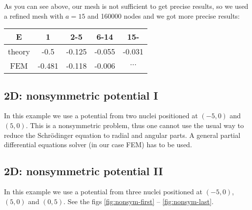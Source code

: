 As you can see above, our mesh is not sufficient to get precise results, so we
used a refined mesh with $a=15$ and 160000 nodes and we got more precise
results:

\begin{tabular}{ c | c c c c }
E      & 1 & 2-5 & 6-14 & 15- \\
\hline
theory & -0.5 & -0.125 & -0.055 & -0.031 \\
FEM    & -0.481 & -0.118 & -0.006 & $\cdots$ \\
\end{tabular}

\subsection{2D: nonsymmetric potential I}

In this example we use a potential from two nuclei positioned at $(-5, 0)$ and
$(5, 0)$. This is a nonsymmetric problem, thus one cannot use the usual
way to reduce the Schr\"odinger equation to radial and angular
parts. A general partial differential equations solver (in our case FEM) has to
be used.

\subsection{2D: nonsymmetric potential II}

In this example we use a potential from three nuclei positioned at $(-5, 0)$,
$(5, 0)$ and $(0, 5)$. See the figs \ref{fig:nonsym-first} --
\ref{fig:nonsym-last}.









